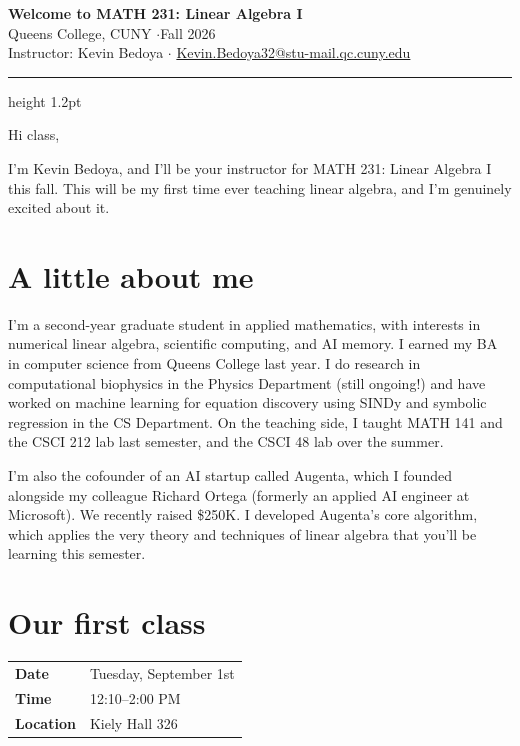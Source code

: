 \documentclass[11pt]{article}
\begin{document}
\begin{center}
  {\LARGE\bfseries\color{accent} Welcome to MATH 231: Linear Algebra I}\\[0.45em]
  {\large Queens College, CUNY \quad$\cdot$\quad Fall 2026}\\[0.6em]
  {\normalsize Instructor: Kevin Bedoya \quad$\cdot$\quad
   \href{mailto:Kevin.Bedoya32@stu-mail.qc.cuny.edu}{Kevin.Bedoya32@stu-mail.qc.cuny.edu}}
\end{center}

\vspace{0.4em}
{\color{rule}\hrule height 1.2pt}
\vspace{1.2em}

Hi class,

I'm Kevin Bedoya, and I'll be your instructor for MATH 231: Linear Algebra I this fall. This will be my first time ever teaching linear algebra, and I'm genuinely excited about it.

\section{A little about me}

I'm a second-year graduate student in applied mathematics, with interests in numerical linear algebra, scientific computing, and AI memory. I earned my BA in computer science from Queens College last year. I do research in computational biophysics in the Physics Department (still ongoing!) and have worked on machine learning for equation discovery using SINDy and symbolic regression in the CS Department. On the teaching side, I taught MATH 141 and the CSCI 212 lab last semester, and the CSCI 48 lab over the summer.

I'm also the cofounder of an AI startup called Augenta, which I founded alongside my colleague Richard Ortega (formerly an applied AI engineer at Microsoft). We recently raised \$250K. I developed Augenta's core algorithm, which applies the very theory and techniques of linear algebra that you'll be learning this semester.

\section{Our first class}

\begin{center}
\begin{tabular}{@{}>{\bfseries}l l@{}}
\toprule
Date & Tuesday, September 1st \\
Time & 12:10--2:00 PM \\
Location & Kiely Hall 326 \\
\bottomrule
\end{tabular}
\end{center}
\end{document}
